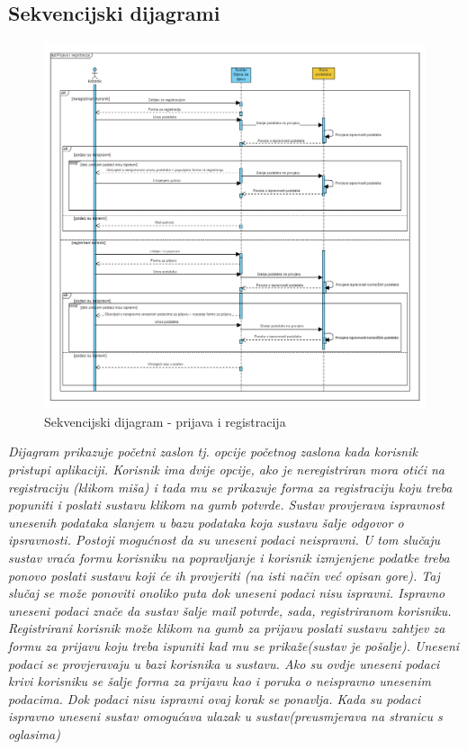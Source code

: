 			\subsection{Sekvencijski dijagrami}
				\begin{figure}[H]
						\includegraphics[width=\textwidth,height=0.7\textheight]{dijagrami/sq_d_pr_reg.png}
						\centering
						\caption{Sekvencijski dijagram - prijava i registracija}
						\label{fig:Prijava i regirtracija}
				\end{figure}
				\textit{Dijagram prikazuje početni zaslon tj. opcije početnog zaslona kada korisnik pristupi aplikaciji. Korisnik ima dvije opcije, ako je neregistriran mora otići na registraciju (klikom miša) i tada mu se prikazuje forma za registraciju koju treba popuniti i poslati sustavu klikom na gumb potvrde. Sustav provjerava ispravnost unesenih podataka slanjem u bazu podataka koja sustavu šalje odgovor o ipsravnosti. Postoji mogućnost da su uneseni podaci neispravni. U tom slučaju sustav vraća formu korisniku na popravljanje i korisnik izmjenjene podatke treba ponovo poslati sustavu koji će ih provjeriti (na isti način već opisan gore). Taj slučaj se može ponoviti onoliko puta dok uneseni podaci nisu ispravni. Ispravno uneseni podaci znače da sustav šalje mail potvrde, sada, registriranom korisniku.\\ Registrirani korisnik može klikom na gumb za prijavu poslati sustavu zahtjev za formu za prijavu koju treba ispuniti kad mu se prikaže(sustav je pošalje). Uneseni podaci se provjeravaju u bazi korisnika u sustavu. Ako su ovdje uneseni podaci krivi korisniku se šalje forma za prijavu kao i poruka o neispravno unesenim podacima. Dok podaci nisu ispravni ovaj korak se ponavlja. Kada su podaci ispravno uneseni sustav omogućava ulazak u sustav(preusmjerava na stranicu s oglasima)}
				\newline
				
